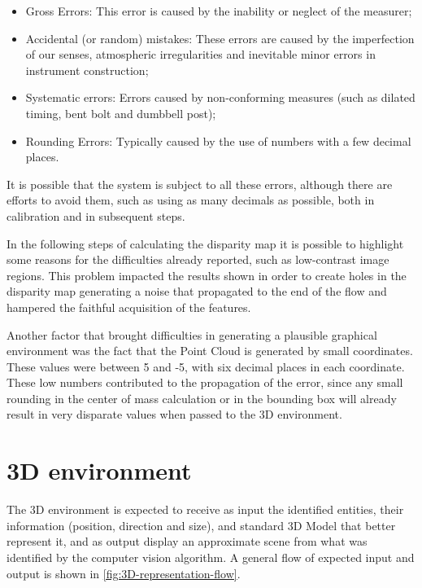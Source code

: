     \begin{itemize}
    \item Gross Errors: This error is caused by the inability or neglect of the measurer;
    \item Accidental (or random) mistakes: These errors are caused by the imperfection of our senses, atmospheric irregularities and inevitable minor errors in instrument construction;
    \item Systematic errors: Errors caused by non-conforming measures (such as dilated timing, bent bolt and dumbbell post);
    \item Rounding Errors: Typically caused by the use of numbers with a few decimal places.

\end{itemize}

    It is possible that the system is subject to all these errors, although there are efforts to avoid them, such as using as many decimals as possible, both in calibration and in subsequent steps.
    
    In the following steps of calculating the disparity map it is possible to highlight some reasons for the difficulties already reported, such as low-contrast image regions. This problem impacted the results shown in order to create holes in the disparity map generating a noise that propagated to the end of the flow and hampered the faithful acquisition of the features.
    
    Another factor that brought difficulties in generating a plausible graphical environment was the fact that the Point Cloud is generated by small coordinates. These values were between 5 and -5, with six decimal places in each coordinate. These low numbers contributed to the propagation of the error, since any small rounding in the center of mass calculation or in the bounding box will already result in very disparate values when passed to the 3D environment.

\section{3D environment}
    
    The 3D environment is expected to receive as input the identified entities, their information (position, direction and size), and standard 3D Model  that better represent it, and as output display an approximate scene from what was identified by the computer vision algorithm. A general flow of expected input and output is shown in \autoref{fig:3D-representation-flow}.
    
